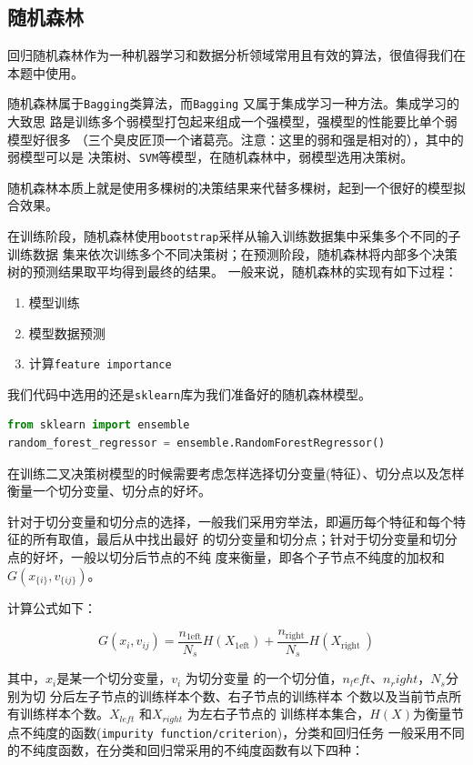 \documentclass[11pt,a4paper]{elegantpaper}
\begin{document}
\begin{multicols}{2}
\subsection{随机森林}

回归随机森林作为一种机器学习和数据分析领域常用且有效的算法，很值得我们在本题中使用。

随机森林属于\lstinline{Bagging}类算法，而\lstinline{Bagging} 又属于集成学习一种方法。集成学习的大致思
路是训练多个弱模型打包起来组成一个强模型，强模型的性能要比单个弱模型好很多
（三个臭皮匠顶一个诸葛亮。注意：这里的弱和强是相对的），其中的弱模型可以是
决策树、\lstinline{SVM}等模型，在随机森林中，弱模型选用决策树。

随机森林本质上就是使用多棵树的决策结果来代替多棵树，起到一个很好的模型拟合效果。

在训练阶段，随机森林使用\lstinline{bootstrap}采样从输入训练数据集中采集多个不同的子训练数据
集来依次训练多个不同决策树；在预测阶段，随机森林将内部多个决策树的预测结果取平均得到最终的结果。
一般来说，随机森林的实现有如下过程：

\begin{enumerate}
  \item 模型训练
  \item 模型数据预测
  \item 计算\lstinline{feature importance}
\end{enumerate}

我们代码中选用的还是\lstinline{sklearn}库为我们准备好的随机森林模型。

\begin{lstlisting}[language=Python]
from sklearn import ensemble
random_forest_regressor = ensemble.RandomForestRegressor()
\end{lstlisting}

在训练二叉决策树模型的时候需要考虑怎样选择切分变量(特征）、切分点以及怎样衡量一个切分变量、切分点的好坏。

针对于切分变量和切分点的选择，一般我们采用穷举法，即遍历每个特征和每个特征的所有取值，最后从中找出最好
的切分变量和切分点；针对于切分变量和切分点的好坏，一般以切分后节点的不纯
度来衡量，即各个子节点不纯度的加权和 $G\left(x_{\{i\}}, v_{\{i j\}}\right)$。

计算公式如下：

$$
G\left(x_{i}, v_{i j}\right)=\frac{n_{1 \mathrm{eft}}}{N_{s}} H\left(X_{1 \mathrm{eft}}\right)+\frac{n_{\text {right }}}{N_{s}} H\left(X_{\text {right }}\right)
$$

其中，$x_i$是某一个切分变量，$v_{i}$ 为切分变量
的一个切分值，$n_left$、$n_right$，$N_s$分别为切
分后左子节点的训练样本个数、右子节点的训练样本
个数以及当前节点所有训练样本个数。$X_{left}$ 和$X_{right}$ 为左右子节点的
训练样本集合，$H(X)$为衡量节点不纯度的函数(\lstinline{impurity function/criterion})，分类和回归任务
一般采用不同的不纯度函数，在分类和回归常采用的不纯度函数有以下四种：


\end{multicols}
\end{document}
